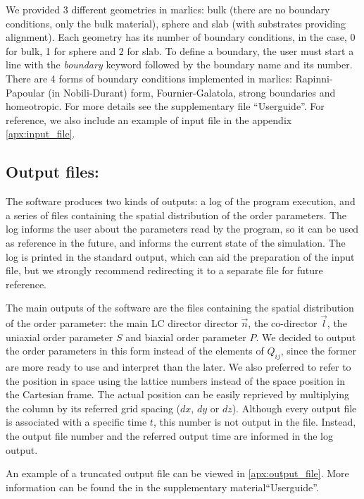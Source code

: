 \documentclass[final,5p,times,twocolumn]{elsarticle}
\begin{document}
We provided 3 different geometries in marlics: bulk (there are no boundary conditions, only the bulk material), sphere and slab (with substrates providing alignment). Each geometry has its number of boundary conditions, in the case, 0 for bulk, 1 for sphere and 2 for slab. To define a boundary, the user must start a line with the \textit{boundary} keyword followed by the boundary name and its number. There are 4 forms of boundary conditions implemented in marlics: Rapinni-Papoular (in Nobili-Durant) form, Fournier-Galatola, strong boundaries and homeotropic. For more details see the supplementary file ``Userguide''.  For
reference, we also include an example of input file in the appendix
\ref{apx:input_file}.

\subsection{Output files:}\label{sec:output_files}

The software produces two kinds of outputs: a log of the program execution,
and a series of files containing the spatial distribution of the order
parameters. The log informs the user about the
parameters read by the program, so it can be used as reference in the
future, and informs the current state of the simulation. The log is
printed in the standard output, which can aid the preparation of the
input file, but we strongly recommend redirecting it to a separate file
for future reference.

The main outputs of the software are the files containing the spatial
distribution of the order parameter: the main LC director director
$\vec{n}$, the co-director $\vec{l}$, the uniaxial order parameter $S$
and biaxial order parameter $P$. We decided to output the order
parameters in this form instead of the elements of $Q_{ij}$, since the
former are more ready to use and interpret than the later.  We also
preferred to refer to the position in space using the lattice numbers
instead of the space position in the Cartesian frame. The actual
position can be easily reprieved by multiplying the column by its
referred grid spacing ($dx$, $dy$ or $dz$). Although every output file
is associated with a specific time $t$, this number is not output in the
file. Instead, the output file number and the referred output time are
informed in the log output. 

An example of a truncated output file
can be viewed in \ref{apx:output_file}.  More information can
be found the in the supplementary material``Userguide''.
\end{document}
